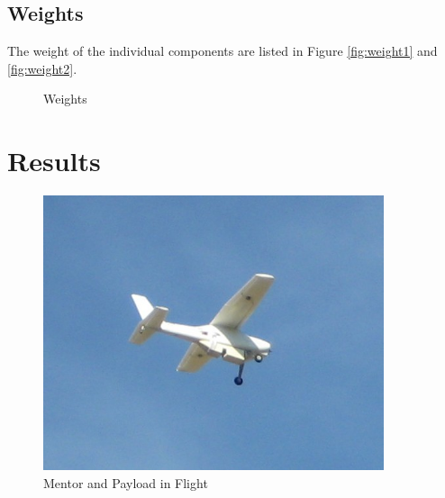 \documentclass[a4paper,11pt]{report}
\begin{document}
\section{Weights}

The weight of the individual components are listed in Figure \ref{fig:weight1} and \ref{fig:weight2}.

\begin{figure}[ht]
  \centering
  \caption{Weights}
  \label{fig:weights}
\end{figure} 

\chapter{Results}

\begin{figure}[ht]
 \centering
 \includegraphics[width=10cm]{mentor_in_flight.JPG}
 \caption{Mentor and Payload in Flight}
 \label{fig:mentor_flying}
\end{figure}
\end{document}
